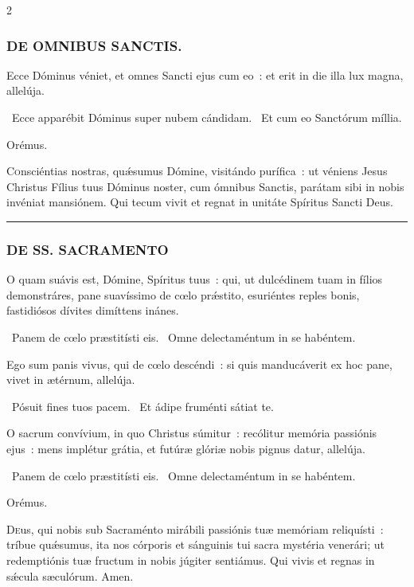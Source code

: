 \documentclass[9pt,twoside]{extarticle}
\begin{document}
\begin{multicols}{2}
{{\subsubsection*{\center \textsc{DE OMNIBUS SANCTIS.}}
\begin{tightlist}{}
\item {} Ecce Dóminus véniet, et omnes Sancti ejus cum eo~: et erit in die illa lux magna, allelúja.
\item {}~Ecce apparébit Dóminus super nubem cándidam. ~Et cum eo Sanctórum míllia.
\item Orémus. \hfill {}
\end{tightlist}
\lettrine{C}onsciéntias nostras, quǽsumus Dómine, visitándo purífica~: ut véniens Jesus Christus Fílius tuus Dóminus noster, cum ómnibus Sanctis, parátam sibi in nobis invéniat mansiónem. Qui tecum vivit et regnat in unitáte Spíritus Sancti Deus.

\begin{center}\textcolor{red}{\rule{\linewidth}{0.5pt}} \end{center}

\subsubsection*{\center \textsc{DE SS. SACRAMENTO}}
\begin{tightlist}{}
\item {}
\item {} O quam suávis est, Dómine, Spíritus tuus~: qui, ut dulcédinem tuam in fílios demonstráres, pane suavíssimo de cœlo prǽstito, esuriéntes reples bonis, fastidiósos dívites dimíttens inánes.
\item {}~Panem de cœlo præstitísti eis. ~Omne delectaméntum in se habéntem.
\item {} Ego sum panis vivus, qui de cœlo descéndi~: si quis manducáverit ex hoc pane, vivet in ætérnum, allelúja.
\item {}~Pósuit fines tuos pacem. ~Et ádipe fruménti sátiat te.
\item {} O sacrum convívium, in quo Christus súmitur~: recólitur memória passiónis ejus~: mens implétur grátia, et futúræ glóriæ nobis pignus datur, allelúja.
\item {}~Panem de cœlo præstitísti eis. ~Omne delectaméntum in se habéntem.
\item Orémus. \hfill {}
\end{tightlist}
\lettrine{D}eus, qui nobis sub Sacraménto mirábili passiónis tuæ memóriam reliquísti~: tríbue quǽsumus, ita nos córporis et sánguinis tui sacra mystéria venerári; ut redemptiónis tuæ fructum in nobis júgiter sentiámus. Qui vivis et regnas in sǽcula sæculórum. Amen.

}}
\end{multicols}
\end{document}
